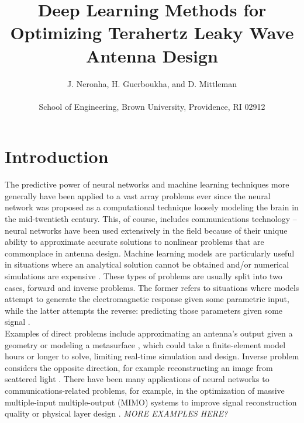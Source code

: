 \documentclass[11pt]{article}
\begin{document}
\title{Deep Learning Methods for Optimizing Terahertz Leaky Wave Antenna Design}
\author{J. Neronha, H. Guerboukha, and D. Mittleman \\ \\ \small School of Engineering, Brown University, Providence, RI 02912}
\date{}

\maketitle

\section*{Introduction}

The predictive power of neural networks and machine learning techniques more generally have been applied to a vast array problems ever since the neural network was proposed as a computational technique loosely modeling the brain in the mid-twentieth century. \cite{McCulloch:1943vq} This, of course, includes communications technology -- neural networks have been used extensively in the field because of their unique ability to approximate accurate solutions to nonlinear problems that are commonplace in antenna design. Machine learning models are particularly useful in situations where an analytical solution cannot be obtained and/or numerical simulations are expensive \cite{Kim, Massa}. These types of problems are usually split into two cases, forward and inverse problems. The former refers to situations where models attempt to generate the electromagnetic response given some parametric input, while the latter attempts the reverse: predicting those parameters given some signal \cite{9395365}. \\

\noindent Examples of direct problems include approximating an antenna's output given a geometry \cite{8608745} or modeling a metasurface \cite{Nadell:19}, which could take a finite-element model hours or longer to solve, limiting real-time simulation and design. Inverse problem considers the opposite direction, for example reconstructing an image from scattered light \cite{Sun:18}. There have been many applications of neural networks to communications-related problems, for example, in the optimization of massive multiple-input multiple-output (MIMO) systems to improve signal reconstruction quality \cite{8322184} or physical layer design \cite{DBLP:journals/corr/OSheaEC17}. \emph{MORE EXAMPLES HERE?} \\
\end{document}
